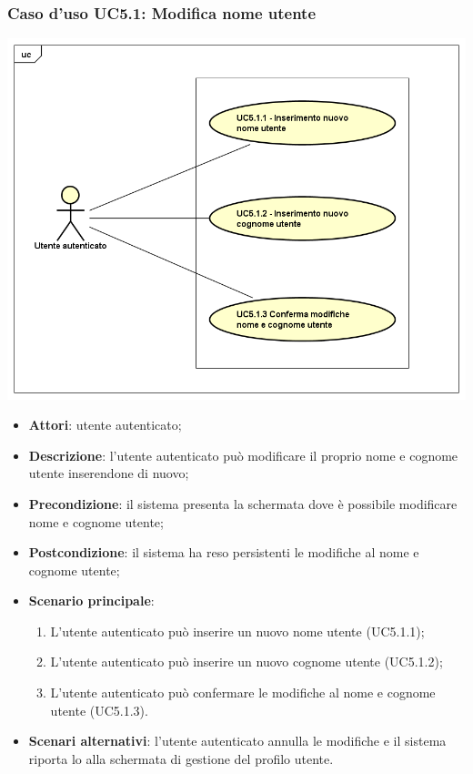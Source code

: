 \subsubsection{Caso d'uso UC5.1: Modifica nome utente}
\begin{center}
	\includegraphics[scale=0.5]{UML/UC5_1.png}
\end{center}

\begin{itemize}
	\item \textbf{Attori}: utente autenticato;
	\item \textbf{Descrizione}: l'utente autenticato può modificare il proprio nome e cognome utente inserendone di nuovo;
	\item \textbf{Precondizione}: il sistema presenta la schermata dove è possibile modificare nome e cognome utente;
	\item \textbf{Postcondizione}: il sistema ha reso persistenti le modifiche al nome e cognome utente;
	\item \textbf{Scenario principale}:
		\begin{enumerate}
			\item L'utente autenticato può inserire un nuovo nome utente (UC5.1.1);
			\item L'utente autenticato può inserire un nuovo cognome utente (UC5.1.2);
			\item L'utente autenticato può confermare le modifiche al nome e cognome utente (UC5.1.3).
		\end{enumerate}
	\item \textbf{Scenari alternativi}: l'utente autenticato annulla le modifiche e il sistema riporta lo alla schermata di gestione del profilo utente.
\end{itemize}

